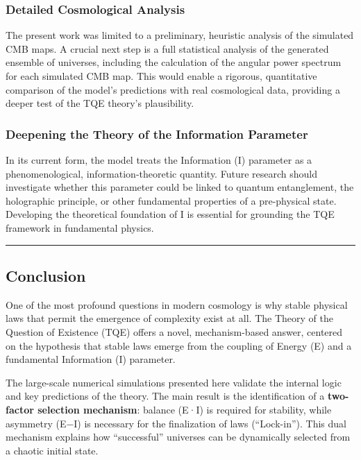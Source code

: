 \subsubsection{Detailed Cosmological
Analysis}\label{detailed-cosmological-analysis}

The present work was limited to a preliminary, heuristic analysis of the
simulated CMB maps. A crucial next step is a full statistical analysis
of the generated ensemble of universes, including the calculation of the
angular power spectrum for each simulated CMB map. This would enable a
rigorous, quantitative comparison of the model's predictions with real
cosmological data, providing a deeper test of the TQE theory's
plausibility.

\subsubsection{Deepening the Theory of the Information
Parameter}\label{deepening-the-theory-of-the-information-parameter}

In its current form, the model treats the Information (I) parameter as a
phenomenological, information-theoretic quantity. Future research should
investigate whether this parameter could be linked to quantum
entanglement, the holographic principle, or other fundamental properties
of a pre-physical state. Developing the theoretical foundation of I is
essential for grounding the TQE framework in fundamental physics.

\begin{center}\rule{0.5\linewidth}{0.5pt}\end{center}

\subsection{Conclusion}\label{conclusion-1}

One of the most profound questions in modern cosmology is why stable
physical laws that permit the emergence of complexity exist at all. The
Theory of the Question of Existence (TQE) offers a novel,
mechanism-based answer, centered on the hypothesis that stable laws
emerge from the coupling of Energy (E) and a fundamental Information (I)
parameter.

The large-scale numerical simulations presented here validate the
internal logic and key predictions of the theory. The main result is the
identification of a \textbf{two-factor selection mechanism}: balance
(E·I) is required for stability, while asymmetry (\textbar E−I\textbar)
is necessary for the finalization of laws (``Lock-in''). This dual
mechanism explains how ``successful'' universes can be dynamically
selected from a chaotic initial state.

